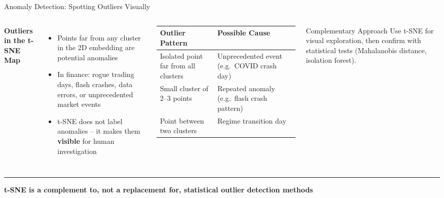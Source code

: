 \documentclass[8pt,aspectratio=169]{beamer}
\newcommand{\bottomnote}[1]{%
\vfill
\vspace{-2mm}
\textcolor{mllavender2}{\rule{\textwidth}{0.4pt}}
\vspace{1mm}
\footnotesize
\textbf{#1}
}
\newenvironment{compactlist}{%
  \begin{itemize}%
    \setlength{\itemsep}{2pt}%
    \setlength{\parskip}{0pt}%
    \setlength{\parsep}{0pt}%
}{%
  \end{itemize}%
}
\newcommand{\highlight}[1]{\textcolor{mlorange}{\textbf{#1}}}
\begin{document}
\begin{frame}[t]{Anomaly Detection: Spotting Outliers Visually}
\begin{columns}[T]
\small
\textbf{Outliers in the t-SNE Map}

\vspace{2mm}
\begin{compactlist}
\item Points far from any cluster in the 2D embedding are potential anomalies
\item In finance: rogue trading days, flash crashes, data errors, or unprecedented market events
\item t-SNE does not label anomalies -- it makes them \highlight{visible} for human investigation
\end{compactlist}

\vspace{2mm}
\footnotesize
\begin{tabular}{@{}l l@{}}
\toprule
\textbf{Outlier Pattern} & \textbf{Possible Cause} \\
\midrule
\rowcolor{mllavender4}
Isolated point far from all clusters & Unprecedented event (e.g.\ COVID crash day) \\
Small cluster of 2--3 points & Repeated anomaly (e.g.\ flash crash pattern) \\
\rowcolor{mllavender4}
Point between two clusters & Regime transition day \\
\bottomrule
\end{tabular}

\vspace{2mm}
\begin{block}{Complementary Approach}
\scriptsize Use t-SNE for visual exploration, then confirm with statistical tests (Mahalanobis distance, isolation forest).
\end{block}
\end{columns}

\bottomnote{t-SNE is a complement to, not a replacement for, statistical outlier detection methods}
\end{frame}
\end{document}

